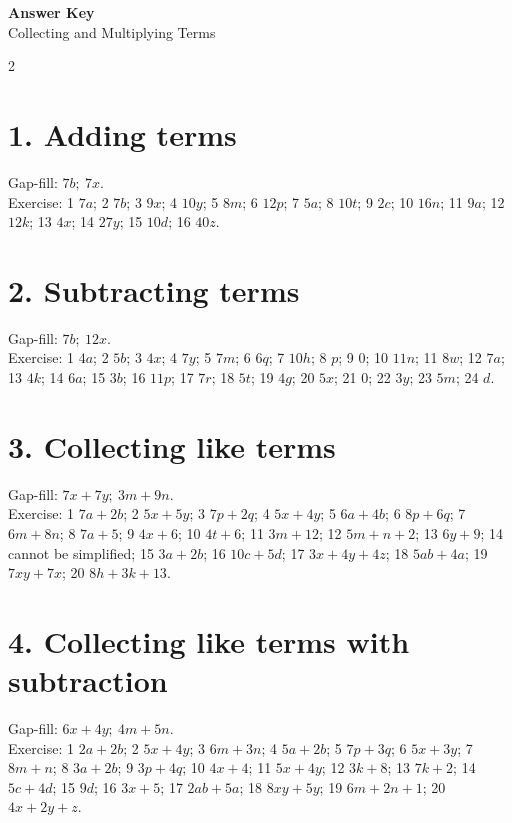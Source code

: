 \documentclass[12pt,a4paper]{article}
\begin{document}
\begin{center}
  {\LARGE\bfseries Answer Key}\\[2pt]
  {\Large Collecting and Multiplying Terms}
\end{center}

\small
\begin{multicols}{2}

\section*{1. Adding terms}
Gap-fill: \(7b;\ 7x\).\\
Exercise: 1 \(7a\); 2 \(7b\); 3 \(9x\); 4 \(10y\); 5 \(8m\); 6 \(12p\); 7 \(5a\); 8 \(10t\); 9 \(2c\); 10 \(16n\); 11 \(9a\); 12 \(12k\); 13 \(4x\); 14 \(27y\); 15 \(10d\); 16 \(40z\).

\section*{2. Subtracting terms}
Gap-fill: \(7b;\ 12x\).\\
Exercise: 1 \(4a\); 2 \(5b\); 3 \(4x\); 4 \(7y\); 5 \(7m\); 6 \(6q\); 7 \(10h\); 8 \(p\); 9 \(0\); 10 \(11n\); 11 \(8w\); 12 \(7a\); 13 \(4k\); 14 \(6a\); 15 \(3b\); 16 \(11p\); 17 \(7r\); 18 \(5t\); 19 \(4g\); 20 \(5x\); 21 \(0\); 22 \(3y\); 23 \(5m\); 24 \(d\).

\section*{3. Collecting like terms}
Gap-fill: \(7x+7y;\ 3m+9n\).\\
Exercise: 1 \(7a+2b\); 2 \(5x+5y\); 3 \(7p+2q\); 4 \(5x+4y\); 5 \(6a+4b\); 6 \(8p+6q\); 7 \(6m+8n\); 8 \(7a+5\); 9 \(4x+6\); 10 \(4t+6\); 11 \(3m+12\); 12 \(5m+n+2\); 13 \(6y+9\); 14 cannot be simplified; 15 \(3a+2b\); 16 \(10c+5d\); 17 \(3x+4y+4z\); 18 \(5ab+4a\); 19 \(7xy+7x\); 20 \(8h+3k+13\).

\section*{4. Collecting like terms with subtraction}
Gap-fill: \(6x+4y;\ 4m+5n\).\\
Exercise: 1 \(2a+2b\); 2 \(5x+4y\); 3 \(6m+3n\); 4 \(5a+2b\); 5 \(7p+3q\); 6 \(5x+3y\); 7 \(8m+n\); 8 \(3a+2b\); 9 \(3p+4q\); 10 \(4x+4\); 11 \(5x+4y\); 12 \(3k+8\); 13 \(7k+2\); 14 \(5c+4d\); 15 \(9d\); 16 \(3x+5\); 17 \(2ab+5a\); 18 \(8xy+5y\); 19 \(6m+2n+1\); 20 \(4x+2y+z\).


\end{multicols}
\end{document}
